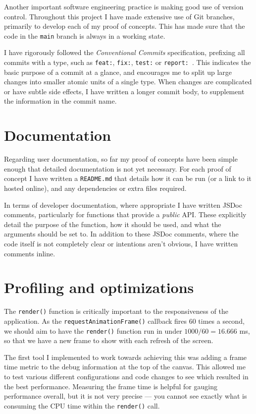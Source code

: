 \documentclass{final_report}
\begin{document}
Another important software engineering practice is making good use of version control. Throughout this project I have made extensive use of Git branches, primarily to develop each of my proof of concepts. This has made sure that the code in the \texttt{main} branch is always in a working state.

I have rigorously followed the \emph{Conventional Commits} specification, prefixing all commits with a type, such as \texttt{feat:}, \texttt{fix:}, \texttt{test:} or \texttt{report:}~\cite{conventional-commits}. This indicates the basic purpose of a commit at a glance, and encourages me to split up large changes into smaller atomic units of a single type. When changes are complicated or have subtle side effects, I have written a longer commit body, to supplement the information in the commit name.

\section{Documentation}

Regarding user documentation, so far my proof of concepts have been simple enough that detailed documentation is not yet necessary. For each proof of concept I have written a \texttt{README.md} that details how it can be run (or a link to it hosted online), and any dependencies or extra files required.

In terms of developer documentation, where appropriate I have written JSDoc comments, particularly for functions that provide a \emph{public} API\@. These explicitly detail the purpose of the function, how it should be used, and what the arguments should be set to. In addition to these JSDoc comments, where the code itself is not completely clear or intentions aren't obvious, I have written comments inline.

\section{Profiling and optimizations}\label{sec:profiling}

The \texttt{render()} function is critically important to the responsiveness of the application. As the \texttt{requestAnimationFrame()} callback fires 60 times a second, we should aim to have the \texttt{render()} function run in under \(1000/60=16.666\) ms, so that we have a new frame to show with each refresh of the screen. 

The first tool I implemented to work towards achieving this was adding a frame time metric to the debug information at the top of the canvas. This allowed me to test various different configurations and code changes to see which resulted in the best performance. Measuring the frame time is helpful for gauging performance overall, but it is not very precise --- you cannot see exactly what is consuming the CPU time within the \texttt{render()} call.
\end{document}
